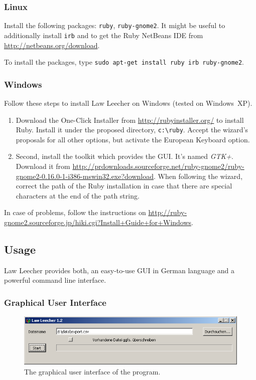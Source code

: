 \documentclass{scrartcl}
\begin{document}
\subsubsection{Linux}
Install the following packages: \texttt{ruby}, \texttt{ruby-gnome2}. It might be useful to additionally install \texttt{irb} and to get the Ruby NetBeans IDE from \url{http://netbeans.org/download}.

To install the packages, type \texttt{sudo apt-get install ruby irb ruby-gnome2}.

\subsubsection{Windows}
Follow these steps to install Law Leecher on Windows (tested on Windows~XP).


\begin{enumerate}
\item Download the One-Click Installer from \url{http://rubyinstaller.org/} to install Ruby. Install it under the proposed directory, \texttt{c:\textbackslash ruby}. Accept the wizard's proposals for all other options, but activate the European Keyboard option.

\item Second, install the toolkit which provides the GUI. It's named \textit{GTK+}. Download it from \url{http://prdownloads.sourceforge.net/ruby-gnome2/ruby-gnome2-0.16.0-1-i386-mswin32.exe?download}. When following the wizard, correct the path of the Ruby installation in case that there are special characters at the end of the path string. 
\end{enumerate}

In case of problems, follow the instructions on \url{http://ruby-gnome2.sourceforge.jp/hiki.cgi?Install+Guide+for+Windows}.

\subsection{Usage}
Law Leecher provides both, an easy-to-use GUI in German language and a powerful command line interface.

\subsubsection{Graphical User Interface}
\begin{figure}[ht]
\begin{center}
\includegraphics[width = \textwidth]{GUI.png}
\caption{The graphical user interface of the program.}
\label{fig:guiwindow}
\end{center}
\end{figure}
\end{document}

